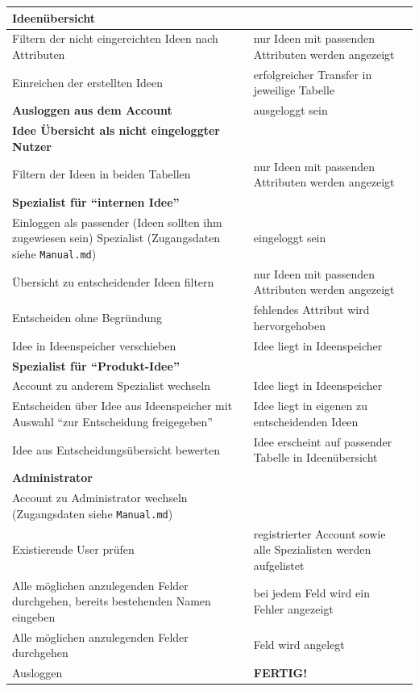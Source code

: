 \begin{center}
\begin{longtable}{|p{}|p{}|p{}|}
\textbf{Ideenübersicht} & &\\
\hline
Filtern der nicht eingereichten Ideen nach Attributen & nur Ideen mit passenden Attributen werden angezeigt &\\
\hline 
Einreichen der erstellten Ideen & erfolgreicher Transfer in jeweilige Tabelle &\\
\hline
\hline

\textbf{Ausloggen aus dem Account} & ausgeloggt sein &\\
\hline
\hline

\textbf{Idee Übersicht als nicht eingeloggter Nutzer} & &\\
\hline 
Filtern der Ideen in beiden Tabellen & nur Ideen mit passenden Attributen werden angezeigt &\\
\hline
\hline

\textbf{Spezialist für \enquote{internen Idee}} & &\\
\hline
Einloggen als passender (Ideen sollten ihm zugewiesen sein) Spezialist (Zugangsdaten siehe \texttt{Manual.md})& eingeloggt sein &\\
\hline
Übersicht zu entscheidender Ideen filtern &  nur Ideen mit passenden Attributen werden angezeigt &\\
\hline
Entscheiden ohne Begründung & fehlendes Attribut wird hervorgehoben &\\
\hline
Idee in Ideenspeicher verschieben & Idee liegt in Ideenspeicher &\\
\hline
\hline

\textbf{Spezialist für \enquote{Produkt-Idee}} & &\\
\hline
Account zu anderem Spezialist wechseln & Idee liegt in Ideenspeicher &\\
\hline
Entscheiden über Idee aus Ideenspeicher mit Auswahl  \enquote{zur Entscheidung freigegeben} & Idee liegt in eigenen zu entscheidenden Ideen &\\
\hline
Idee aus Entscheidungsübersicht bewerten & Idee erscheint auf passender Tabelle in Ideenübersicht &\\
\hline
\hline

\textbf{Administrator} & &\\
\hline
Account zu Administrator wechseln (Zugangsdaten siehe \texttt{Manual.md})& &\\
\hline
Existierende User prüfen & registrierter Account sowie alle Spezialisten werden aufgelistet &\\
\hline 
Alle möglichen anzulegenden Felder durchgehen, bereits bestehenden Namen eingeben & bei jedem Feld wird ein Fehler angezeigt &\\
\hline 
Alle möglichen anzulegenden Felder durchgehen & Feld wird angelegt &\\
\hline
Ausloggen & \textbf{FERTIG!} &\\
\hline
\end{longtable}
\end{center}

